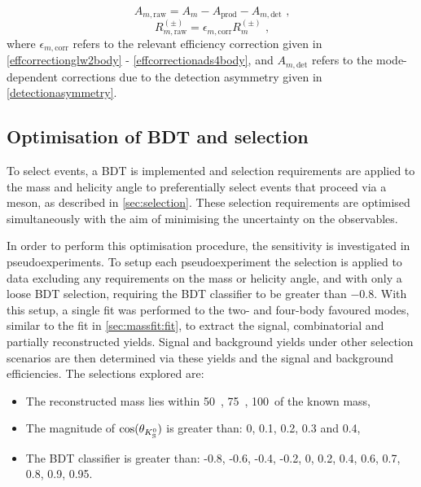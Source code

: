 \begin{equation}
A_{m, \text{raw}} = A_m - A_{\text{prod}} - A_{m, \text{det}} \text{ ,}
\end{equation}
\begin{equation}
R_{m, \text{raw}}^{(\pm)} = \epsilon_{m, \text{corr}}R_m^{(\pm)} \text{ ,}
\end{equation}
where $\epsilon_{m, \text{corr}}$ refers to the relevant efficiency correction given in \eqns\ref{effcorrectionglw2body} - \ref{effcorrectionads4body}, and $A_{m, \text{det}}$ refers to the mode-dependent corrections due to the detection asymmetry given in \tab\ref{detectionasymmetry}.

\subsection{Optimisation of BDT and \Kstar selection}
\label{sec:cpfit:optimisation}

To select \btodkst events, a BDT is implemented and selection requirements are applied to the \Kstarm mass and \KS helicity angle to preferentially select events that proceed via a \Kstarm meson, as described in \sect\ref{sec:selection}. These selection requirements are optimised simultaneously with the aim of minimising the uncertainty on the \CP observables. 

In order to perform this optimisation procedure, the sensitivity is investigated in pseudoexperiments. To setup each pseudoexperiment the selection is applied to data excluding any requirements on the \Kstarm mass or \KS helicity angle, and with only a loose BDT selection, requiring the BDT classifier to be greater than $-0.8$. With this setup, a single fit was performed to the two- and four-body favoured modes, similar to the fit in \sect\ref{sec:massfit:fit}, to extract the signal, combinatorial and partially reconstructed yields. Signal and background yields under other selection scenarios are then determined via these yields and the signal and background efficiencies. The selections explored are:

\begin{itemize}
\item{The reconstructed \Kstarm mass lies within 50~\mevcc, 75~\mevcc, 100~\mevcc of the known \Kstarm mass,}
\item{The magnitude of $\cos(\theta_{{{K}^0_{\mathrm{ \scriptscriptstyle S}}}})$ is greater than: 0, 0.1, 0.2, 0.3 and 0.4,}
\item{The BDT classifier is greater than: -0.8, -0.6, -0.4, -0.2, 0, 0.2, 0.4, 0.6, 0.7, 0.8, 0.9, 0.95.}
\end{itemize}

